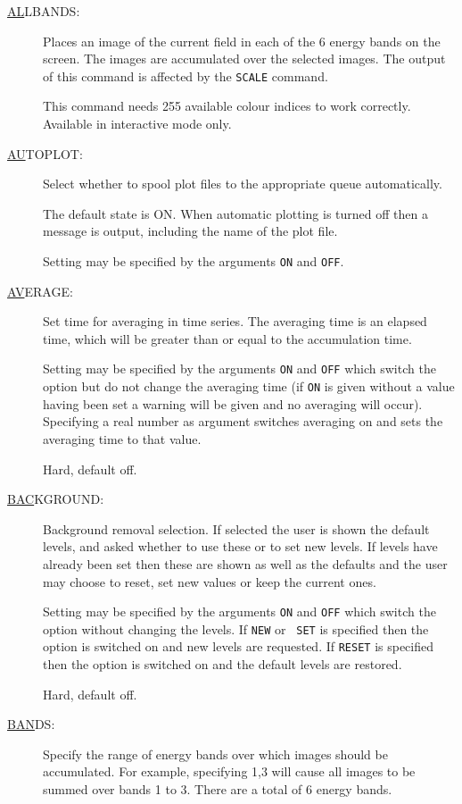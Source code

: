 \begin{description}
\item[\underline{AL}LBANDS: ] \label{al}
Places an image of the current field in each of the 6 energy bands on
the screen.  The images are accumulated over the selected images. The
output of this command is affected by the {\tt SCALE} command.

This command needs 255 available colour indices to work correctly.
Available in interactive mode only.

\item[\underline{AU}TOPLOT: ] \label{au}
Select whether to spool plot files to the appropriate queue
automatically.

The default state is ON. When automatic plotting is turned off then a
message is output, including the name of the plot file.

Setting may be specified by the arguments {\tt ON} and {\tt OFF}.

\item[\underline{AV}ERAGE: ] \label{av}
Set time for averaging in time series. The averaging time is an elapsed
time, which will be greater than or equal to the accumulation time.

Setting may be specified by the arguments {\tt ON} and {\tt OFF} which
switch the option but do not change the averaging time (if {\tt ON} is
given without a value having been set a warning will be given and no
averaging will occur). Specifying a real number as argument switches
averaging on and sets the averaging time to that value.

Hard, default off.

\item[\underline{BAC}KGROUND: ] \label{bac}
Background removal selection. If selected the user is shown the default
levels, and asked whether to use these or to set new levels.  If levels
have already been set then these are shown as well as the defaults and
the user may choose to reset, set new values or keep the current ones.

Setting may be specified by the arguments {\tt ON} and {\tt OFF} which
switch the option without changing the levels. If {\tt NEW} or {\tt
SET} is specified then the option is switched on and new levels are
requested.  If {\tt RESET} is specified then the option is switched on
and the default levels are restored.

Hard, default off.

\item[\underline{BAN}DS: ] \label{ban}
Specify the range of energy bands over which images should be
accumulated. For example, specifying 1,3 will cause all images to be
summed over bands 1 to 3. There are a total of 6 energy bands.


\end{description}
